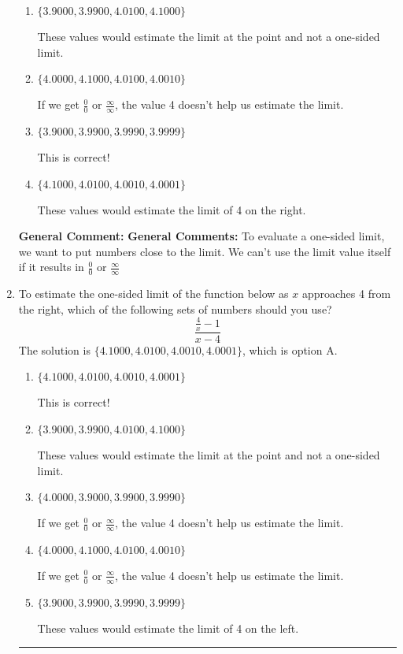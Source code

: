\documentclass{extbook}[14pt]
\newcommand{\litem}[1]{\item #1

\rule{\textwidth}{0.4pt}}
\begin{document}
\begin{enumerate}
{\begin{enumerate}[label=\Alph*.]
If we get $\frac{0}{0}$ or $\frac{\infty}{\infty}$, the value 4 doesn't help us estimate the limit.
\item \( \{ 3.9000, 3.9900, 4.0100, 4.1000 \} \)

These values would estimate the limit at the point and not a one-sided limit.
\item \( \{ 4.0000, 4.1000, 4.0100, 4.0010 \} \)

If we get $\frac{0}{0}$ or $\frac{\infty}{\infty}$, the value 4 doesn't help us estimate the limit.
\item \( \{ 3.9000, 3.9900, 3.9990, 3.9999 \} \)

This is correct!
\item \( \{ 4.1000, 4.0100, 4.0010, 4.0001 \} \)

These values would estimate the limit of 4 on the right.
\end{enumerate}

\textbf{General Comment:} \textbf{General Comments:} To evaluate a one-sided limit, we want to put numbers close to the limit. We can't use the limit value itself if it results in $\frac{0}{0}$ or $\frac{\infty}{\infty}$
}
\litem{
To estimate the one-sided limit of the function below as $x$ approaches 4 from the right, which of the following sets of numbers should you use?
\[ \frac{\frac{4}{x} - 1}{x - 4} \]The solution is \( \{ 4.1000, 4.0100, 4.0010, 4.0001 \} \), which is option A.\begin{enumerate}[label=\Alph*.]
\item \( \{ 4.1000, 4.0100, 4.0010, 4.0001 \} \)

This is correct!
\item \( \{ 3.9000, 3.9900, 4.0100, 4.1000 \} \)

These values would estimate the limit at the point and not a one-sided limit.
\item \( \{ 4.0000, 3.9000, 3.9900, 3.9990 \} \)

If we get $\frac{0}{0}$ or $\frac{\infty}{\infty}$, the value 4 doesn't help us estimate the limit.
\item \( \{ 4.0000, 4.1000, 4.0100, 4.0010 \} \)

If we get $\frac{0}{0}$ or $\frac{\infty}{\infty}$, the value 4 doesn't help us estimate the limit.
\item \( \{ 3.9000, 3.9900, 3.9990, 3.9999 \} \)

These values would estimate the limit of 4 on the left.
\end{enumerate}

}
\end{enumerate}
\end{document}
